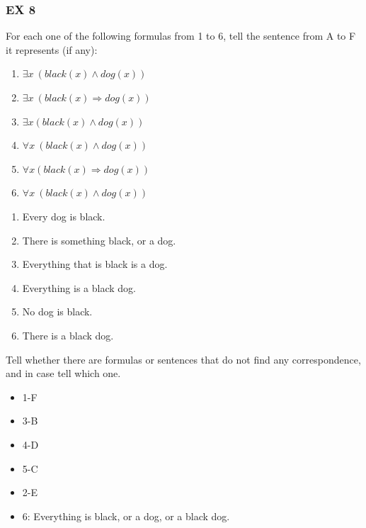\documentclass[10pt,a4paper]{article}
\begin{document}
\begin{itemize}
\begin{enumerate}
\end{enumerate}

\subsubsection{EX 8}
For each one of the following formulas from 1 to 6, tell the sentence from A to F it represents (if any):
\begin{enumerate}

\item $\exists x\ (black(x) \wedge dog(x))$
\item $\exists x\ (black(x)\Rightarrow dog(x)) $
\item $\exists x(black(x) \wedge dog(x))$
\item $\forall x\ (black(x) \wedge dog(x)) $
\item $\forall x(black(x)\Rightarrow dog(x))$
\item $\forall x\ (black(x) \wedge dog(x))$
\end{enumerate}

\begin{enumerate}[label=\Alph*]
\item Every dog is black.
\item There is something black, or a dog. 
\item Everything that is black is a dog. 
\item Everything is a black dog.
\item No dog is black.
\item There is a black dog.
\end{enumerate}
 
Tell whether there are formulas or sentences that do not find any correspondence, and in case tell which one.

\begin{itemize}
\item 1-F
\item 3-B
\item 4-D
\item 5-C
\item 2-E 
\item 6: Everything is black, or a dog, or a black dog.
\end{itemize}


\end{itemize}
\end{document}
